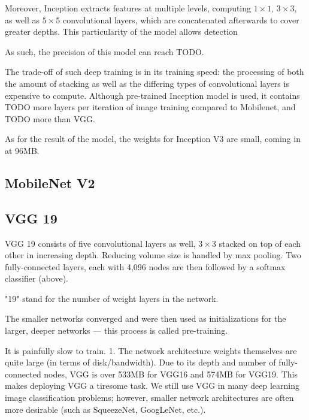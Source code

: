 \documentclass[se,blockletter]{uw-wkrpt}
\begin{document}
Moreover, Inception extracts features at multiple levels, computing $1\times 1$, $3\times 3$, as well as $5 \times 5$ convolutional layers, which are concatenated afterwards to cover greater depths. This particularity of the model allows detection 

As such, the precision of this model can reach TODO.

The trade-off of such deep training is in its training speed: the processing of both the amount of stacking as well as the differing types of convolutional layers is expensive to compute. Although pre-trained Inception model is used, it contains TODO more layers per iteration of image training compared to Mobilenet, and TODO more than VGG.


As for the result of the model, the weights for Inception V3 are small, coming in at 96MB.



\subsection{MobileNet V2}


\subsection{VGG 19}
VGG 19 consists of five convolutional layers as well, $3 \times 3$ stacked on top of each other in increasing depth. Reducing volume size is handled by max pooling. Two fully-connected layers, each with 4,096 nodes are then followed by a softmax classifier (above).

"19" stand for the number of weight layers in the network.

The smaller networks converged and were then used as initializations for the larger, deeper networks — this process is called pre-training.


It is painfully slow to train.
    1. The network architecture weights themselves are quite large (in terms of disk/bandwidth).
Due to its depth and number of fully-connected nodes, VGG is over 533MB for VGG16 and 574MB for VGG19. This makes deploying VGG a tiresome task.
We still use VGG in many deep learning image classification problems; however, smaller network architectures are often more desirable (such as SqueezeNet, GoogLeNet, etc.).
\end{document}
